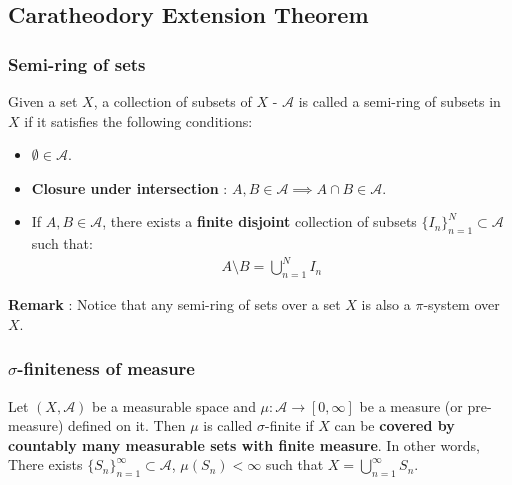\newpage
\subsection{Caratheodory Extension Theorem}
\subsubsection{Semi-ring of sets}
\begin{definition}
    Given a set $X$, a collection of subsets of $X$ - $\mathcal{A}$ is called a semi-ring of subsets in $X$ if it satisfies the following conditions:
    \begin{itemize}
        \item $\emptyset \in \mathcal{A}$.
        \item \textbf{Closure under intersection} : $A, B \in \mathcal{A} \implies A \cap B \in \mathcal{A}$.
        \item If $A, B \in \mathcal{A}$, there exists a \textbf{finite disjoint} collection of subsets $\{I_n\}_{n=1}^N\subset \mathcal{A}$ such that:
        \begin{align*}
            A \setminus B = \bigcup_{n=1}^N I_n
        \end{align*}
    \end{itemize}
\end{definition}

\noindent \textbf{Remark} : Notice that any semi-ring of sets over a set $X$ is also a $\pi$-system over $X$.

\subsubsection{$\sigma$-finiteness of measure}
\begin{definition}
    Let $(X, \mathcal{A})$ be a measurable space and $\mu:\mathcal{A} \to [0, \infty]$ be a measure (or pre-measure) defined on it. Then $\mu$ is called $\sigma$-finite if $X$ can be \textbf{covered by countably many measurable sets with finite measure}. In other words,
    There exists $\{S_n\}_{n=1}^\infty \subset \mathcal{A}$, $\mu(S_n) < \infty$ such that $X = \bigcup_{n=1}^\infty S_n$.
\end{definition}

